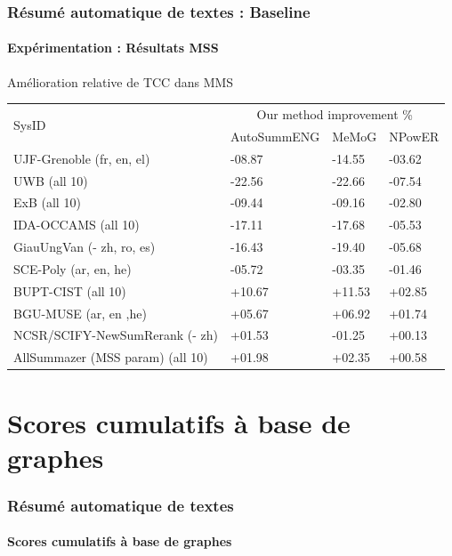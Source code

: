 \documentclass[xcolor=table]{beamer}
\begin{document}
\begin{frame}
\frametitle{Résumé automatique de textes : Baseline}
\framesubtitle{Expérimentation : Résultats MSS}
	
\begin{block}{Amélioration relative de TCC dans MMS}
	\scriptsize\bfseries
	\begin{tabular}{p{}p{}p{}p{}} 
		\hline \hline
		\multirow{2}{*}{SysID} & \multicolumn{3}{c}{Our method improvement \%}\\
		\cline{2-4}
		& AutoSummENG 	& MeMoG 	& NPowER \\
		\hline
		UJF-Grenoble (fr, en, el) 	& -08.87 		& -14.55	& -03.62 \\
		UWB (all 10) 		& -22.56 		& -22.66 	& -07.54 \\
		ExB (all 10) 		& -09.44 		& -09.16 	& -02.80 \\
		IDA-OCCAMS (all 10) 		& -17.11 		& -17.68 	& -05.53 \\
		GiauUngVan (- zh, ro, es)	& -16.43		& -19.40	& -05.68 \\
		SCE-Poly (ar, en, he)	& -05.72		& -03.35	& -01.46 \\
		BUPT-CIST (all 10)		& +10.67		& +11.53	& +02.85 \\
		BGU-MUSE (ar, en ,he)	& +05.67		& +06.92	& +01.74 \\
		NCSR/SCIFY-NewSumRerank (- zh)		& +01.53		& -01.25	& +00.13 \\
		\hline
		AllSummazer (MSS param) (all 10)		& +01.98		& +02.35	& +00.58 \\
		\hline \hline
	\end{tabular}
\end{block}
	
\end{frame}

%
\section{Scores cumulatifs à base de graphes} 

\begin{frame}
\frametitle{Résumé automatique de textes}
\framesubtitle{Scores cumulatifs à base de graphes}
	
	\begin{center}
	\end{center}
	
\end{frame}
\end{document}
